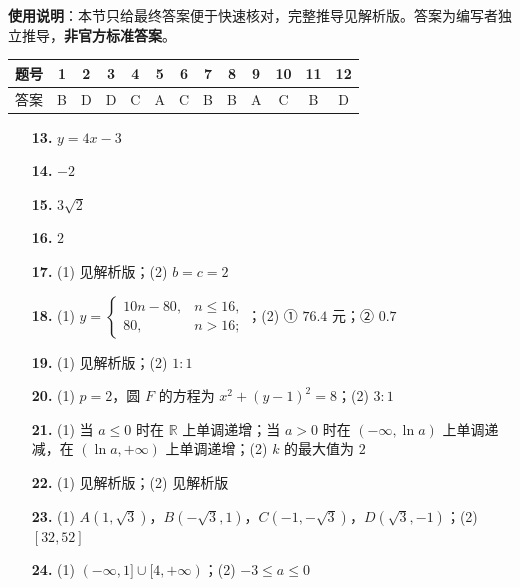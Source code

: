 
\begin{gknotice}
\textbf{使用说明}：本节只给最终答案便于快速核对，完整推导见解析版。答案为编写者独立推导，\textbf{非官方标准答案}。
\end{gknotice}

\begin{center}\begin{tabular}{ccccccccccccc}
\toprule
题号 & 1 & 2 & 3 & 4 & 5 & 6 & 7 & 8 & 9 & 10 & 11 & 12 \\
\midrule
答案 & B & D & D & C & A & C & B & B & A & C & B & D \\
\bottomrule
\end{tabular}\end{center}

\begin{itemize}[leftmargin=2.6em]
  \item[\textbf{13.}] $y=4x-3$
  \item[\textbf{14.}] $-2$
  \item[\textbf{15.}] $3\sqrt2$
  \item[\textbf{16.}] $2$
\end{itemize}

\begin{itemize}[leftmargin=2.6em]
  \item[\textbf{17.}] (1) 见解析版；(2) $b=c=2$
  \item[\textbf{18.}] (1) $y=\begin{cases}10n-80,&n\leqslant16,\\80,&n>16;\end{cases}$；(2) ① $76.4$ 元；② $0.7$
  \item[\textbf{19.}] (1) 见解析版；(2) $1:1$
  \item[\textbf{20.}] (1) $p=2$，圆 $F$ 的方程为 $x^2+(y-1)^2=8$；(2) $3:1$
  \item[\textbf{21.}] (1) 当 $a\leqslant0$ 时在 $\mathbb R$ 上单调递增；当 $a>0$ 时在 $(-\infty,\ln a)$ 上单调递减，在 $(\ln a,+\infty)$ 上单调递增；(2) $k$ 的最大值为 $2$
  \item[\textbf{22.}] (1) 见解析版；(2) 见解析版
  \item[\textbf{23.}] (1) $A(1,\sqrt3)$，$B(-\sqrt3,1)$，$C(-1,-\sqrt3)$，$D(\sqrt3,-1)$；(2) $[32,52]$
  \item[\textbf{24.}] (1) $(-\infty,1]\cup[4,+\infty)$；(2) $-3\leqslant a\leqslant0$
\end{itemize}
